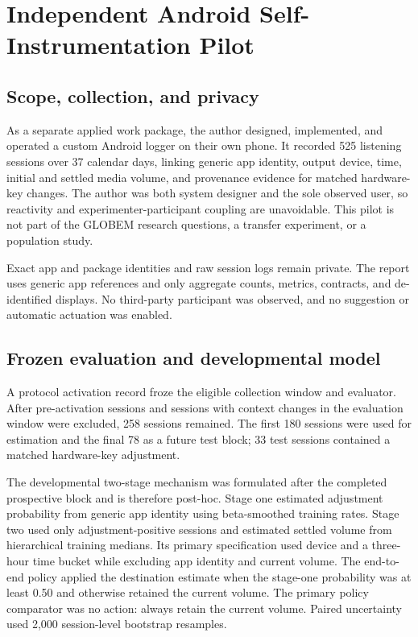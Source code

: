 \documentclass[a4paper,11pt,oneside]{report}
\begin{document}
\chapter{Independent Android Self-Instrumentation Pilot}
\label{app:android-pilot}

\section{Scope, collection, and privacy}

As a separate applied work package, the author designed, implemented, and operated
a custom Android logger on their own phone. It recorded 525 listening sessions over
37 calendar days, linking generic app identity, output device, time, initial and
settled media volume, and provenance evidence for matched hardware-key changes. The
author was both system designer and the sole observed user, so reactivity and
experimenter-participant coupling are unavoidable. This pilot is not part of the
GLOBEM research questions, a transfer experiment, or a population study.

Exact app and package identities and raw session logs remain private. The report
uses generic app references and only aggregate counts, metrics, contracts, and
de-identified displays. No third-party participant was observed, and no suggestion
or automatic actuation was enabled.

\section{Frozen evaluation and developmental model}

A protocol activation record froze the eligible collection window and evaluator.
After pre-activation sessions and sessions with context changes in the evaluation
window were excluded, 258 sessions remained. The first 180 sessions were used for
estimation and the final 78 as a future test block; 33 test sessions contained a
matched hardware-key adjustment.

The developmental two-stage mechanism was formulated after the completed
prospective block and is therefore post-hoc. Stage one estimated adjustment
probability from generic app identity using beta-smoothed training rates. Stage two
used only adjustment-positive sessions and estimated settled volume from
hierarchical training medians. Its primary specification used device and a
three-hour time bucket while excluding app identity and current volume. The
end-to-end policy applied the destination estimate when the stage-one probability
was at least 0.50 and otherwise retained the current volume. The primary policy
comparator was no action: always retain the current volume. Paired uncertainty used
2,000 session-level bootstrap resamples.
\end{document}

